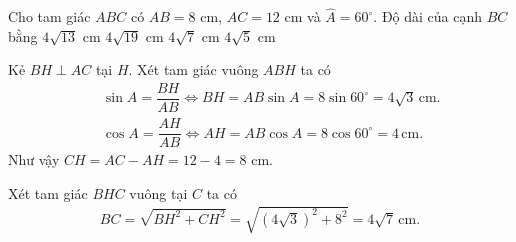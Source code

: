 \begin{bt}%
	Cho tam giác $ABC$ có $AB=8$ cm, $AC=12$ cm và $\widehat{A}=60^\circ$. Độ dài của cạnh $BC$ bằng
	\choice
	{$4\sqrt{13}$ cm}
	{$4\sqrt{19}$ cm}
	{\True $4\sqrt{7}$ cm}
	{$4\sqrt{5}$ cm}
	\loigiai
	{
		\immini
		{
			Kẻ $BH\perp AC$ tại $H$. Xét tam giác vuông $ABH$ ta có
			\begin{eqnarray*}
				&& \sin A = \dfrac{BH}{AB} \Leftrightarrow BH=AB\sin A=8\sin 60^\circ=4\sqrt{3}\mathrm{\,cm}.\\
				&& \cos A = \dfrac{AH}{AB} \Leftrightarrow AH=AB\cos A=8\cos 60^\circ=4 \mathrm{\,cm}.
			\end{eqnarray*}
			Như vậy $CH=AC-AH=12-4=8$ cm.
		}
		{
		}
		\noindent
		Xét tam giác $BHC$ vuông tại $C$ ta có
		\begin{eqnarray*}
			BC=\sqrt{BH^2+CH^2} = \sqrt{\left(4\sqrt{3}\right)^2+8^2} = 4\sqrt{7}\mathrm{\,cm}.
		\end{eqnarray*}
	}
\end{bt}

